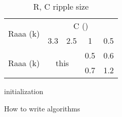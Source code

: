 \documentclass{article}
\begin{document}
\begin{table}[ht]
\centering
\begin{tabular}{ccccc}
  \toprule
    \multirow{2}{*}{Raaa (k)} & \multicolumn{4}{c}{C ()} \\
    \cmidrule{2-5} & 3.3 & 2.5 & 1 & 0.5 \\
  \midrule
    \multirow{2}{*}{Raaa (k)} & \multicolumn{2}{c}{\multirow{2}{*}{this}} & 0.5 & 0.6 \\
    \cmidrule{4-5}            & \multicolumn{2}{c}{}                      & 0.7 & 1.2 \\
  \bottomrule
\end{tabular}
\caption{R, C ripple size}
\end{table}


\begin{algorithm}[H]
\SetAlgoLined
{}
 initialization\;
 \caption{How to write algorithms}
\end{algorithm}
\end{document}
